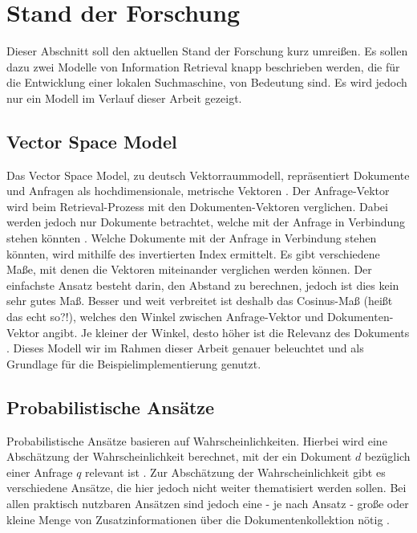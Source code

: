 \section{Stand der Forschung}
Dieser Abschnitt soll den aktuellen Stand der Forschung kurz umreißen.
Es sollen dazu zwei Modelle von Information Retrieval knapp beschrieben werden, die für die Entwicklung einer lokalen Suchmaschine, von Bedeutung sind. Es wird jedoch nur ein Modell im Verlauf dieser Arbeit gezeigt.
\newline

\subsection{Vector Space Model}
Das Vector Space Model, zu deutsch Vektorraummodell, repräsentiert Dokumente und Anfragen als hochdimensionale, metrische Vektoren \cite{VR_Retrieval}.
Der Anfrage-Vektor wird beim Retrieval-Prozess mit den Dokumenten-Vektoren verglichen. Dabei werden jedoch nur Dokumente betrachtet, welche mit der Anfrage in Verbindung stehen könnten \cite{klass_IR}. Welche Dokumente mit der Anfrage in Verbindung stehen könnten, wird mithilfe des invertierten Index ermittelt.
\newline
Es gibt verschiedene Maße, mit denen die Vektoren miteinander verglichen werden können. Der einfachste Ansatz besteht darin, den Abstand zu berechnen, jedoch ist dies kein sehr gutes Maß. 
Besser und weit verbreitet ist deshalb das Cosinus-Maß (heißt das echt so?!), welches den Winkel zwischen Anfrage-Vektor und Dokumenten-Vektor angibt. Je kleiner der Winkel, desto höher ist die Relevanz des Dokuments  \cite{IR_Uni_Duisburg}.
\newline
Dieses Modell wir im Rahmen dieser Arbeit genauer beleuchtet und als Grundlage für die Beispielimplementierung genutzt.

\subsection{Probabilistische Ansätze}
Probabilistische Ansätze basieren auf Wahrscheinlichkeiten. Hierbei wird eine Abschätzung der Wahrscheinlichkeit berechnet, mit der ein Dokument $d$ bezüglich einer Anfrage $q$ relevant ist \cite{IR_Uni_Duisburg}.
Zur Abschätzung der Wahrscheinlichkeit gibt es verschiedene Ansätze, die hier jedoch nicht weiter thematisiert werden sollen. Bei allen praktisch nutzbaren Ansätzen sind jedoch eine - je nach Ansatz - große oder kleine Menge von Zusatzinformationen über die Dokumentenkollektion nötig \cite{IR_Uni_Duisburg}.